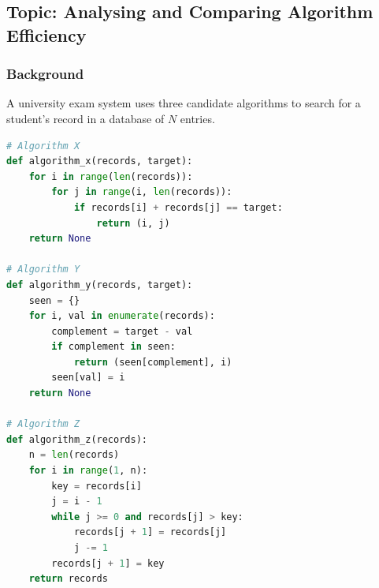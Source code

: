 \documentclass[11pt,a4paper]{article}
\begin{document}
\subsection*{Topic: Analysing and Comparing Algorithm Efficiency}

\subsubsection*{Background}
A university exam system uses three candidate algorithms to search for a student's record in a database of $N$ entries.

\begin{lstlisting}[language=Python]
# Algorithm X
def algorithm_x(records, target):
    for i in range(len(records)):
        for j in range(i, len(records)):
            if records[i] + records[j] == target:
                return (i, j)
    return None

# Algorithm Y
def algorithm_y(records, target):
    seen = {}
    for i, val in enumerate(records):
        complement = target - val
        if complement in seen:
            return (seen[complement], i)
        seen[val] = i
    return None

# Algorithm Z
def algorithm_z(records):
    n = len(records)
    for i in range(1, n):
        key = records[i]
        j = i - 1
        while j >= 0 and records[j] > key:
            records[j + 1] = records[j]
            j -= 1
        records[j + 1] = key
    return records
\end{lstlisting}
\end{document}

